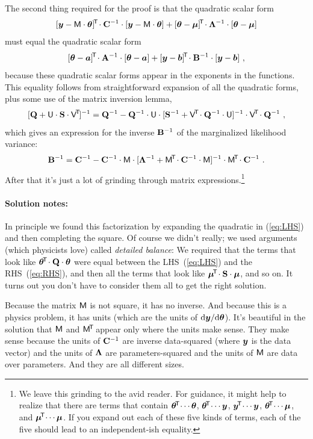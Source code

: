 The second thing required for the proof is that the quadratic scalar form
\begin{equation}\label{eq:LHS}
[\boldsymbol{y}-\mathsf{M}\cdot\boldsymbol{\theta}]^{\!\mathsf{T}\!}\cdot\mathbf{C}^{-1}\cdot[\boldsymbol{y}-\mathsf{M}\cdot\boldsymbol{\theta}]
+ [\boldsymbol{\theta}-\boldsymbol{\mu}]^{\!\mathsf{T}\!}\cdot\mathbf{\Lambda}^{-1}\cdot[\boldsymbol{\theta}-\boldsymbol{\mu}]
\end{equation}
must equal the quadratic scalar form
\begin{equation}\label{eq:RHS}
[\boldsymbol{\theta}-\boldsymbol{a}]^{\!\mathsf{T}\!}\cdot\mathbf{A}^{-1}\cdot[\boldsymbol{\theta}-\boldsymbol{a}]
+ [\boldsymbol{y}-\boldsymbol{b}]^{\!\mathsf{T}\!}\cdot\mathbf{B}^{-1}\cdot[\boldsymbol{y}-\boldsymbol{b}]
~,
\end{equation}
because these quadratic scalar forms appear in the exponents in the functions.
This equality follows from straightforward expansion of
all the quadratic forms, plus some use of the matrix inversion lemma,
\begin{equation}\label{eq:invlemma}
[\mathbf{Q} + \mathsf{U}\cdot\mathbf{S}\cdot\mathsf{V}^{\!\mathsf{T}\!}]^{-1} = \mathbf{Q}^{-1} - \mathbf{Q}^{-1}\cdot\mathsf{U}\cdot[\mathbf{S}^{-1} + \mathsf{V}^{\!\mathsf{T}\!}\cdot\mathbf{Q}^{-1}\cdot\mathsf{U}]^{-1}\cdot\mathsf{V}^{\!\mathsf{T}\!}\cdot\mathbf{Q}^{-1}
~ ,
\end{equation}
which gives an expression for the inverse $\mathbf{B}^{-1}$ of the marginalized
likelihood variance:
\begin{equation}
\mathbf{B}^{-1} = \mathbf{C}^{-1} - \mathbf{C}^{-1}\cdot\mathsf{M}\cdot[\mathbf{\Lambda}^{-1} + \mathsf{M}^{\!\mathsf{T}\!}\cdot\mathbf{C}^{-1}\cdot\mathsf{M}]^{-1}\cdot\mathsf{M}^{\!\mathsf{T}\!}\cdot\mathbf{C}^{-1}
~ .
\end{equation}
After that it's just a lot of grinding through matrix expressions.\footnote{%
We leave this grinding to the avid reader.
For guidance, it might help to realize that there are terms that
contain $\boldsymbol{\theta}^{\!\mathsf{T}\!}\cdots\boldsymbol{\theta}$, $\boldsymbol{\theta}^{\!\mathsf{T}\!}\cdots\boldsymbol{y}$, $\boldsymbol{y}^{\!\mathsf{T}\!}\cdots\boldsymbol{y}$,
$\boldsymbol{\theta}^{\!\mathsf{T}\!}\cdots\boldsymbol{\mu}$, and $\boldsymbol{\mu}^{\!\mathsf{T}\!}\cdots\boldsymbol{\mu}$.
If you expand out each of these five kinds of terms, each of the five
should lead to an independent-ish equality.}

\paragraph{Solution notes:}
In principle we found this factorization by expanding the quadratic in
(\ref{eq:LHS}) and then completing the square.
Of course we didn't really; we used arguments (which physicists love)
called \emph{detailed balance}:
We required that the terms that look like
$\boldsymbol{\theta}^{\!\mathsf{T}\!}\cdot\mathbf{Q}\cdot\boldsymbol{\theta}$ were equal between the LHS~(\ref{eq:LHS})
and the RHS~(\ref{eq:RHS}), and then all the terms that look like
$\boldsymbol{\mu}^{\!\mathsf{T}\!}\cdot\mathbf{S}\cdot\boldsymbol{\mu}$, and so on.
It turns out you don't have to consider them all to get the right solution.

Because the matrix $\mathsf{M}$ is not square, it has no inverse. And because this
is a physics problem, it has units (which are the units of $\mathrm{d}\boldsymbol{y}/\mathrm{d}\boldsymbol{\theta}$).
It's beautiful in the solution that $\mathsf{M}$ and $\mathsf{M}^{\!\mathsf{T}\!}$ appear only where the
units make sense.
They make sense because the units of $\mathbf{C}^{-1}$ are inverse data-squared (where $\boldsymbol{y}$
is the data vector) and the units of $\mathbf{\Lambda}$ are parameters-squared and the units
of $\mathsf{M}$ are data over parameters.
And they are all different sizes.

